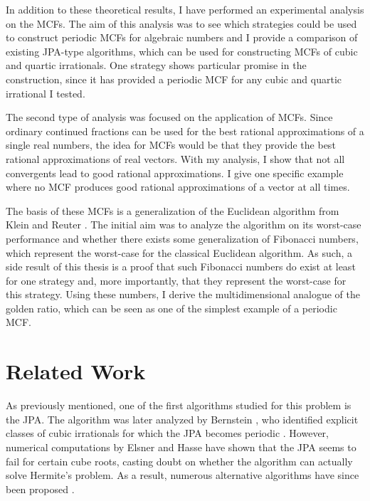 In addition to these theoretical results,
I have performed an experimental analysis on the MCFs.
The aim of this analysis was to see which strategies could be used
to construct periodic MCFs for algebraic numbers
and I provide a comparison of existing JPA-type algorithms,
which can be used for constructing MCFs of cubic and quartic irrationals.
One strategy shows particular promise in the construction,
since it has provided a periodic MCF for any cubic and quartic irrational I tested.

The second type of analysis was focused on the application of MCFs.
Since ordinary continued fractions can be used for the best rational approximations
of a single real numbers, the idea for MCFs would be that they provide the best
rational approximations of real vectors.
With my analysis, I show that not all convergents lead to good rational approximations.
I give one specific example where no MCF produces good rational
approximations of a vector at all times.

The basis of these MCFs is a generalization of the Euclidean algorithm from
Klein and Reuter \cite{Klein24}.
The initial aim was to analyze the algorithm on its worst-case performance
and whether there exists some generalization of Fibonacci numbers,
which represent the worst-case for the classical Euclidean algorithm.
As such, a side result of this thesis is a proof that such Fibonacci numbers do
exist at least for one strategy and, more importantly, that they represent the
worst-case for this strategy.
Using these numbers, I derive the multidimensional analogue of the golden
ratio, which can be seen as one of the simplest example of a periodic MCF.

\section{Related Work}

As previously mentioned,
one of the first algorithms studied for this problem is the JPA.
The algorithm was later analyzed by Bernstein \cite{Bernstein71},
who identified explicit classes of cubic irrationals for which the JPA
becomes periodic \cite{Bernstein64A, Bernstein65, Bernstein64B}.
However, numerical computations by Elsner and Hasse \cite{Elsner67} have shown
that the JPA seems to fail for certain cube roots,
casting doubt on whether the algorithm can actually solve Hermite’s problem.
As a result, numerous alternative algorithms have since been proposed
\cite{Assaf05, Hendy81, Schweiger00, Schweiger13}.

